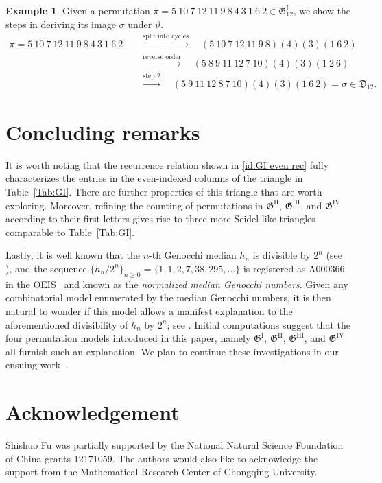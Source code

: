 \documentclass[11pt,reqno]{amsart}
\numberwithin{equation}{section}
\theoremstyle{plain}
\theoremstyle{definition}
\newtheorem{example}[theorem]{Example}
\newcommand{\fD}{\mathfrak{D}}
\newcommand{\fG}{\mathfrak{G}}
\newcommand{\GI}{\fG^{\mathrm{I}}}
\newcommand{\GII}{\fG^{\mathrm{II}}}
\newcommand{\GIII}{\fG^{\mathrm{III}}}
\newcommand{\GIV}{\fG^{\mathrm{IV}}}
\begin{document}
\begin{example}
Given a permutation $\pi=5~10~7~12~11~9~8~4~3~1~6~2\in\GI_{12}$, we show the steps in deriving its image $\sigma$ under $\vartheta$.
	\begin{align*}
		\pi = 5~10~7~12~11~9~8~4~3~1~6~2\quad &\xrightarrow{\text{split into cycles}}\quad (5~10~7~12~11~9~8)(4)(3)(1~6~2) \\
		&\xrightarrow{\text{reverse order}}\quad (5~8~9~11~12~7~10)(4)(3)(1~2~6) \\
		&\xrightarrow{\text{step 2}}\quad (5~9~11~12~8~7~10)(4)(3)(1~6~2) = \sigma\in\fD_{12}.
	\end{align*}
\end{example}





\section{Concluding remarks}
It is worth noting that the recurrence relation shown in \eqref{id:GI even rec} fully characterizes the entries in the even-indexed columns of the triangle in Table~\ref{Tab:GI}. There are further properties of this triangle that are worth exploring. Moreover, refining the counting of permutations in $\GII$, $\GIII$, and $\GIV$ according to their first letters gives rise to three more Seidel-like triangles comparable to Table~\ref{Tab:GI}. 

Lastly, it is well known that the $n$-th Genocchi median $h_n$ is divisible by $2^n$ (see \cite{BD81,big14,PZ23}), and the sequence $\{h_n/2^n\}_{n\ge 0}=\{1,1,2,7,38,295,\ldots\}$ is registered as A000366 in the OEIS~\cite{slo} and known as the \emph{normalized median Genocchi numbers}. Given any combinatorial model enumerated by the median Genocchi numbers, it is then natural to wonder if this model allows a manifest explanation to the aforementioned divisibility of $h_n$ by $2^n$; see \cite[Remark~4.4]{AHT22}. Initial computations suggest that the four permutation models introduced in this paper, namely $\GI$, $\GII$, $\GIII$, and $\GIV$ all furnish such an explanation. We plan to continue these investigations in our ensuing work~\cite{FFLY26}.




\section*{Acknowledgement}
Shishuo Fu was partially supported by the National Natural Science Foundation of China grants 12171059. The authors would also like to acknowledge the support from the Mathematical Research Center of Chongqing University.
\end{document}
